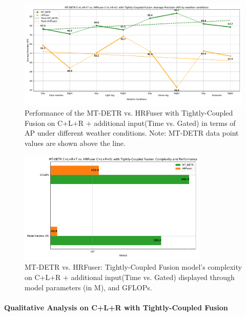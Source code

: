 \documentclass[report.tex]{subfiles}
\begin{document}
    \begin{figure}[h!]
        \centering
        \includegraphics[width=1.0\textwidth]{images/results/hrfuser_vs_mtdetr/clr_g_t/ap.pdf}
        \caption{Performance of the MT-DETR vs. HRFuser with Tightly-Coupled Fusion on C+L+R + additional input(Time vs. Gated) in terms of AP under different weather conditions. Note: MT-DETR data point values are shown above the line.}
        \label{fig:hrfuser_vs_mtdetr_clr_g_t_ap}
    \end{figure}

    \begin{figure}[h!]
        \centering
        \includegraphics[width=0.8\textwidth]{images/results/hrfuser_vs_mtdetr/clr_g_t/model_complexity.pdf}
        \caption{MT-DETR vs. HRFuser: Tightly-Coupled Fusion model's complexity on C+L+R + additional input(Time vs. Gated) displayed through model parameters (in M), and GFLOPs.}
        \label{fig:hrfuser_vs_mtdetr_clr_g_t_model_complexity}
    \end{figure}

    \paragraph*{Qualitative Analysis on C+L+R with Tightly-Coupled Fusion}
\end{document}
